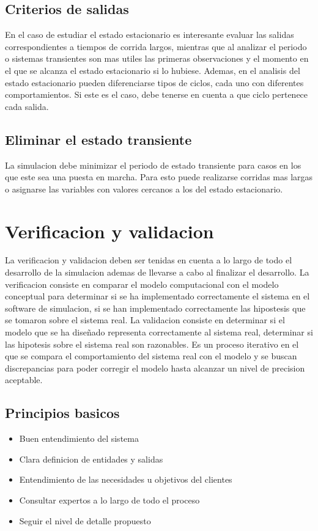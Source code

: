 \documentclass[a4paper]{article}
\begin{document}
\subsection*{Criterios de salidas}
En el caso de estudiar el estado estacionario es interesante evaluar las salidas correspondientes a tiempos de corrida largos, 
mientras que al analizar el periodo o sistemas transientes son mas utiles las primeras observaciones y el momento en el que se 
alcanza el estado estacionario si lo hubiese.
Ademas, en el analisis del estado estacionario pueden diferenciarse tipos de ciclos, cada uno con diferentes comportamientos.
Si este es el caso, debe tenerse en cuenta a que ciclo pertenece cada salida.

\subsection*{Eliminar el estado transiente}
La simulacion debe minimizar el periodo de estado transiente para casos en los que este sea una puesta en marcha. Para esto puede 
realizarse corridas mas largas o asignarse las variables con valores cercanos a los del estado estacionario.

\section*{Verificacion y validacion}
La verificacion y validacion deben ser tenidas en cuenta a lo largo de todo el desarrollo de la simulacion 
ademas de llevarse a cabo al finalizar el desarrollo. 
La verificacion consiste en comparar el modelo computacional con el modelo conceptual para determinar si 
se ha implementado correctamente el sistema en el software de simulacion, si se han implementado correctamente las 
hipostesis que se tomaron sobre el sistema real.
La validacion consiste en determinar si el modelo que se ha diseñado representa correctamente al sistema 
real, determinar si las hipotesis sobre el sistema real son razonables. Es un proceso iterativo en el que se 
compara el comportamiento del sistema real con el modelo y 
se buscan discrepancias para poder corregir el modelo hasta alcanzar un nivel de precision aceptable.

\subsection*{Principios basicos}
\begin{itemize}
    \item Buen entendimiento del sistema
    \item Clara definicion de entidades y salidas
    \item Entendimiento de las necesidades u objetivos del clientes
    \item Consultar expertos a lo largo de todo el proceso
    \item Seguir el nivel de detalle propuesto
\end{itemize}
\end{document}
